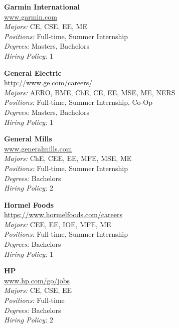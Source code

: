 \documentclass{article}
\begin{document}
\begin{center}
\begin{multicols}{3}
\begin{minipage}{.9\columnwidth}{\Large\bf Garmin International }\\
	\url{www.garmin.com}\\
	\emph{Majors:} CE, CSE, EE, ME\\
	\emph{Positions:} Full-time, Summer Internship\\
	\emph{Degrees:} Masters, Bachelors\\
	\emph{Hiring Policy:} 1\\
\end{minipage}
 
\begin{minipage}{.9\columnwidth}{\Large\bf General Electric }\\
	\url{http://www.ge.com/careers/}\\
	\emph{Majors:} AERO, BME, ChE, CE, EE, MSE, ME, NERS\\
	\emph{Positions:} Full-time, Summer Internship, Co-Op\\
	\emph{Degrees:} Masters, Bachelors\\
	\emph{Hiring Policy:} 1\\
\end{minipage}
 
\begin{minipage}{.9\columnwidth}{\Large\bf General Mills }\\
	\url{www.generalmills.com}\\
	\emph{Majors:} ChE, CEE, EE, MFE, MSE, ME\\
	\emph{Positions:} Full-time, Summer Internship\\
	\emph{Degrees:} Bachelors\\
	\emph{Hiring Policy:} 2\\
\end{minipage}
 
\begin{minipage}{.9\columnwidth}{\Large\bf Hormel Foods }\\
	\url{https://www.hormelfoods.com/careers}\\
	\emph{Majors:} CEE, EE, IOE, MFE, ME\\
	\emph{Positions:} Full-time, Summer Internship\\
	\emph{Degrees:} Bachelors\\
	\emph{Hiring Policy:} 1\\
\end{minipage}
 
\begin{minipage}{.9\columnwidth}{\Large\bf HP }\\
	\url{www.hp.com/go/jobs}\\
	\emph{Majors:} CE, CSE, EE\\
	\emph{Positions:} Full-time\\
	\emph{Degrees:} Bachelors\\
	\emph{Hiring Policy:} 2\\
\end{minipage}
 

\end{multicols}
\end{center}
\end{document}
